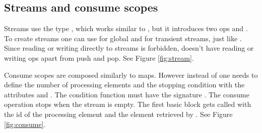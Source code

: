 \subsection{Streams and consume scopes}
Streams use the type , which works similar to , but it introduces two ops  and . To create streams one can use  for global and  for transient streams, just like . Since reading or writing directly to streams is forbidden,  doesn't have reading or writing ops apart from push and pop. See Figure \ref{fig:stream}.

Consume scopes are composed similarly to maps. However instead of  one needs to define the number of processing elements and the stopping condition with the attributes  and . The condition function must have the signature . The consume operation stops when the stream is empty. The first basic block gets called with the id of the processing element and the element retrieved by . See Figure \ref{fig:consume}.
